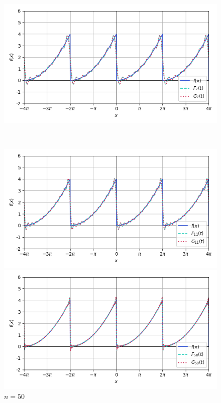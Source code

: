 \documentclass[a4paper]{article}
\begin{document}
\begin{figure}[H]
\begin{minipage}{0.5\textwidth}
        \caption{$n = 4$}
    \end{minipage}\hfill
    \begin{minipage}{0.5\textwidth}
        \centering \includegraphics[width=\textwidth]{periodic_func/7.png}
        \caption{$n = 7$}
    \end{minipage}\\[2em]
    \begin{minipage}{0.5\textwidth}
        \centering \includegraphics[width=\textwidth]{periodic_func/11.png}
        \caption{$n = 11$}
    \end{minipage}\hfill
    \begin{minipage}{0.5\textwidth}
        \centering \includegraphics[width=\textwidth]{periodic_func/50.png}
        \caption{$n = 50$}
    \end{minipage}
\end{figure}\noindent
\end{document}
